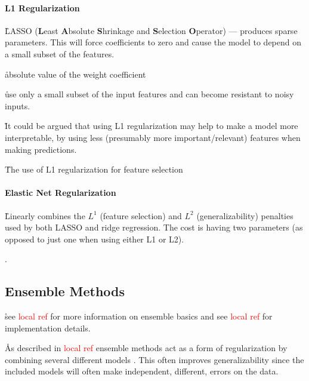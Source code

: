
\paragraph{L1 Regularization}


\r{LASSO (\textbf{L}east \textbf{A}bsolute \textbf{S}hrinkage and \textbf{S}election \textbf{O}perator) --- produces sparse parameters. This will force coefficients to zero and cause the model to depend on a small subset of the features.}

\r{absolute value of the weight coefficient}

\r{use only a small subset of the input features and can become resistant to noisy inputs.}

\r{It could be argued that using L1 regularization may help to make a model more interpretable, by using less (presumably more important/relevant) features when making predictions.}

\r{The use of L1 regularization for feature selection}


\paragraph{Elastic Net Regularization}

\r{Linearly combines the $L^1$ (feature selection) and $L^2$ (generalizability) penalties used by both LASSO and ridge regression. The cost is having two parameters (as opposed to just one when using either L1 or L2).}

.



\subsection{Ensemble Methods}

\r{see \textcolor{red}{local ref} for more information on ensemble basics and see \textcolor{red}{local ref} for implementation details.}

\r{As described in \textcolor{red}{local ref} ensemble methods act as a form of regularization by combining several different models . This often improves generalizability since the included models will often make independent, different, errors on the data.}

